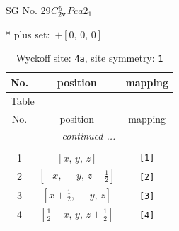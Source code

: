 \documentclass[fleqn,8pt]{jsarticle}
\begin{document}
\setcounter{MaxMatrixCols}{32}

\renewcommand{\tablename}{Table~}
\renewcommand{\figurename}{Figure~}
\begin{center}
\LARGE
SG No. 29\quad$C_{\rm 2v}^{5}$\quad$Pca2_1$\quad[ orthorhombic ]
\end{center}
* plus set:\,\,\,$+\left[ 0,\, 0,\, 0 \right]$
\renewcommand{\arraystretch}{1.2}
\begin{longtable}{ccc}
\caption{Wyckoff site: {\tt 4a}, site symmetry: {\tt 1}}
 \\
 \hline \hline
No. & position & mapping \\ \hline \endfirsthead

\multicolumn{2}{l}{\tablename\ \thetable{}} \\
 \hline \hline
No. & position & mapping \\ \hline \endhead

 \hline \hline
\multicolumn{2}{r}{\footnotesize\it continued ...} \\ \endfoot

 \hline \hline
\multicolumn{2}{r}{} \\ \endlastfoot

1 & $\left[ x,\, y,\, z \right]$ & {\tt [1]} \\ \hline
2 & $\left[ - x,\, - y,\, z + \frac{1}{2} \right]$ & {\tt [2]} \\ \hline
3 & $\left[ x + \frac{1}{2},\, - y,\, z \right]$ & {\tt [3]} \\ \hline
4 & $\left[ \frac{1}{2} - x,\, y,\, z + \frac{1}{2} \right]$ & {\tt [4]} \\
\end{longtable}
\end{document}
